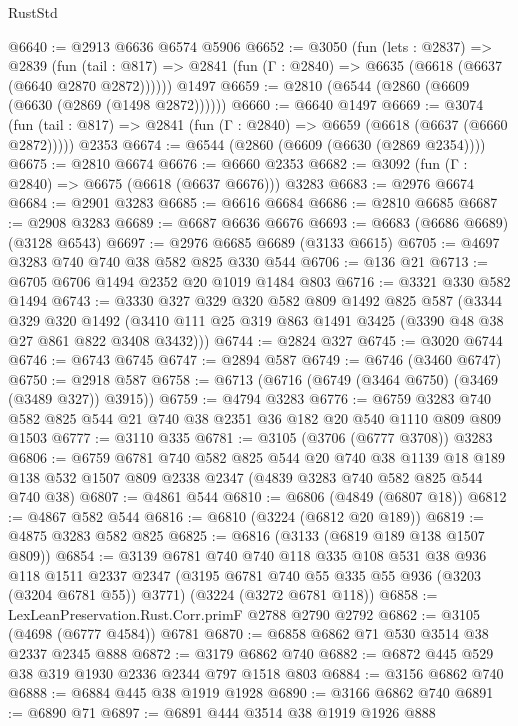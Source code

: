 \begin{lexlean}{RustStd}
\begin{coremodule}
@6640 := @2913 @6636 @6574 @5906
@6652 := @3050
    (fun (lets : @2837) =>
    @2839
      (fun (tail : @817) => @2841 (fun (Γ : @2840) => @6635 (@6618 (@6637 (@6640 @2870 @2872))))))
    @1497
@6659 := @2810 (@6544 (@2860 (@6609 (@6630 (@2869 (@1498 @2872))))))
@6660 := @6640 @1497
@6669 := @3074
    (fun (tail : @817) => @2841 (fun (Γ : @2840) => @6659 (@6618 (@6637 (@6660 @2872)))))
    @2353
@6674 := @6544 (@2860 (@6609 (@6630 (@2869 @2354))))
@6675 := @2810 @6674
@6676 := @6660 @2353
@6682 := @3092 (fun (Γ : @2840) => @6675 (@6618 (@6637 @6676))) @3283
@6683 := @2976 @6674
@6684 := @2901 @3283
@6685 := @6616 @6684
@6686 := @2810 @6685
@6687 := @2908 @3283
@6689 := @6687 @6636 @6676
@6693 := @6683 (@6686 @6689) (@3128 @6543)
@6697 := @2976 @6685 @6689 (@3133 @6615)
@6705 := @4697 @3283 @740 @740 @38 @582 @825 @330 @544
@6706 := @136 @21
@6713 := @6705 @6706 @1494 @2352 @20 @1019 @1484 @803
@6716 := @3321 @330 @582 @1494
@6743 := @3330
    @327
    @329
    @320
    @582
    @809
    @1492
    @825
    @587
    (@3344
      @329
      @320
      @1492
      (@3410 @111 @25 @319 @863 @1491 @3425 (@3390 @48 @38 @27 @861 @822 @3408 @3432)))
@6744 := @2824 @327
@6745 := @3020 @6744
@6746 := @6743 @6745
@6747 := @2894 @587
@6749 := @6746 (@3460 @6747)
@6750 := @2918 @587
@6758 := @6713 (@6716 (@6749 (@3464 @6750) (@3469 (@3489 @327)) @3915))
@6759 := @4794 @3283
@6776 := @6759 @3283 @740 @582 @825 @544 @21 @740 @38 @2351 @36 @182 @20 @540 @1110 @809 @809 @1503
@6777 := @3110 @335
@6781 := @3105 (@3706 (@6777 @3708)) @3283
@6806 := @6759
    @6781
    @740
    @582
    @825
    @544
    @20
    @740
    @38
    @1139
    @18
    @189
    @138
    @532
    @1507
    @809
    @2338
    @2347
    (@4839 @3283 @740 @582 @825 @544 @740 @38)
@6807 := @4861 @544
@6810 := @6806 (@4849 (@6807 @18))
@6812 := @4867 @582 @544
@6816 := @6810 (@3224 (@6812 @20 @189))
@6819 := @4875 @3283 @582 @825
@6825 := @6816 (@3133 (@6819 @189 @138 @1507 @809))
@6854 := @3139
    @6781
    @740
    @740
    @118
    @335
    @108
    @531
    @38
    @936
    @118
    @1511
    @2337
    @2347
    (@3195 @6781 @740 @55 @335 @55 @936 (@3203 (@3204 @6781 @55)) @3771)
    (@3224 (@3272 @6781 @118))
@6858 := LexLeanPreservation.Rust.Corr.primF @2788 @2790 @2792
@6862 := @3105 (@4698 (@6777 @4584)) @6781
@6870 := @6858 @6862 @71 @530 @3514 @38 @2337 @2345 @888
@6872 := @3179 @6862 @740
@6882 := @6872 @445 @529 @38 @319 @1930 @2336 @2344 @797 @1518 @803
@6884 := @3156 @6862 @740
@6888 := @6884 @445 @38 @1919 @1928
@6890 := @3166 @6862 @740
@6891 := @6890 @71
@6897 := @6891 @444 @3514 @38 @1919 @1926 @888

\end{coremodule}
\end{lexlean}

